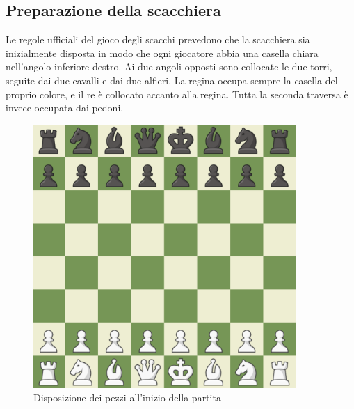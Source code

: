 \subsection{Preparazione della scacchiera}
Le regole ufficiali del gioco degli scacchi\cite{lawsofchess} prevedono che la scacchiera sia inizialmente disposta in modo che ogni giocatore abbia una casella chiara nell'angolo inferiore destro. Ai due angoli opposti sono collocate le due torri, seguite dai due cavalli e dai due alfieri. La regina occupa sempre la casella del proprio colore, e il re è collocato accanto alla regina. Tutta la seconda traversa è invece occupata dai pedoni.
\begin{figure}[!htb]
    \includegraphics[width=10cm]{frontmatter/figure/scacchiera_iniziale.pdf}
    \centering
    \caption{Disposizione dei pezzi all'inizio della partita}
    \label{fig:checkmate}
\end{figure}
